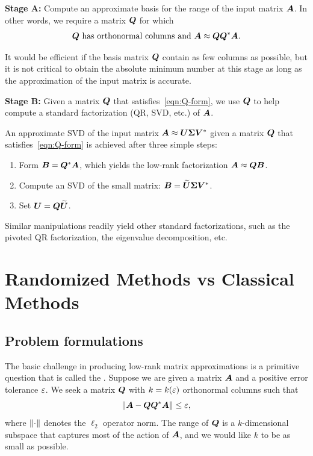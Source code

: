 \documentclass{article}
\begin{document}
\textbf{Stage A:} Compute an approximate basis for the range of the input matrix $\bm{A}$. In other words,
we require a matrix $\bm{Q}$ for which
\begin{equation} \label{eqn:Q-form}
\text{$\bm{Q}$ has orthonormal columns and $\bm{A} \approx \bm{Q}\bm{Q}^{*}\bm{A}$.}
\end{equation}

It would be efficient if the basis matrix $\bm{Q}$ contain as few columns as possible, but it is not critical to obtain the absolute minimum number at this stage as long as
the approximation of the input matrix is accurate.

\vspace{2mm}

\textbf{Stage B:}
Given a matrix $\bm{Q}$ that satisfies~\eqref{eqn:Q-form},
we use $\bm{Q}$ to help compute a standard factorization (QR, SVD, etc.) of $\bm{A}$.

An approximate SVD of the input matrix  $\bm{A} \approx \bm{U\Sigma V}^*$ given a matrix $\bm{Q}$ that satisfies~\eqref{eqn:Q-form} is achieved after three simple steps:
\begin{enumerate}
\item   Form $\bm{B} = \bm{Q}^{*}\bm{A}$, which yields
the low-rank factorization $\bm{A} \approx \bm{Q}\bm{B}$.
\item   Compute an SVD of the small matrix: $\bm{B} = \widetilde{\bm{U}}\bm{\Sigma}\bm{V}^{*}$.
\item   Set $\bm{U} = \bm{Q}\widetilde{\bm{U}}$.
\end{enumerate}

Similar manipulations readily yield other standard factorizations,
such as the pivoted QR factorization, the eigenvalue decomposition, etc.




\section{Randomized Methods vs Classical Methods}

\subsection{Problem formulations}
\label{sec:modelproblem}

The basic challenge in producing low-rank matrix approximations
is a primitive question that is called the .  Suppose we are given a matrix
$\bm{A}$ and a positive error tolerance $\varepsilon$.
We seek a matrix $\bm{Q}$ with $k = k(\varepsilon)$ orthonormal columns
such that
\begin{equation} \label{eq:fixed_precision}
\left\Vert { \bm{A} - \bm{QQ}^*\bm{A} } \right\Vert \leq \varepsilon,
\end{equation}
where $\left\Vert { \cdot } \right\Vert$ denotes the $\ell_2$ operator norm.
The range of $\bm{Q}$ is a $k$-dimensional subspace that captures most of the
action of $\bm{A}$, and we would like $k$ to be as small as possible.
\end{document}
